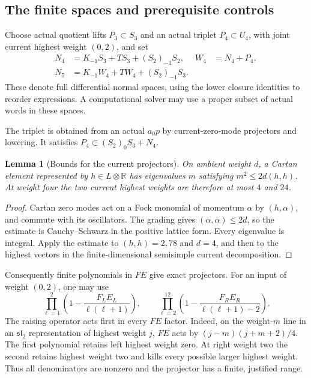 \documentclass[11pt,a4paper]{article}
\newtheorem{lemma}[theorem]{Lemma}
\theoremstyle{definition}
\begin{document}
\subsection{The finite spaces and prerequisite controls}
Choose actual quotient lifts \(P_3\subset S_3\) and an actual triplet
\(P_4\subset U_4\), with joint current highest weight \((0,2)\), and set
\begin{align}
 N_4&=K_{-1}S_3+TS_3+(S_2)_{-1}S_2,&W_4&=N_4+P_4,\label{eq:normal4}\\
 N_5&=K_{-1}W_4+TW_4+(S_2)_{-1}S_3.&&\label{eq:normal5}
\end{align}
These denote full differential normal spaces, using the lower closure
identities to reorder expressions. A computational solver may use a
proper subset of actual words in these spaces.

The triplet is obtained from an actual \(a_0p\) by current-zero-mode
projectors and lowering. It satisfies
\(P_4\subset (S_2)_0S_3+N_4\).

\begin{lemma}[Bounds for the current projectors]\label{lem:current-bounds}
On ambient weight $d$, a Cartan element represented by $h\in L\otimes\mathbb R$
has eigenvalues $m$ satisfying $m^2\leq2d(h,h)$. At weight four
the two current highest weights are therefore at most $4$ and $24$.
\end{lemma}
\begin{proof}
Cartan zero modes act on a Fock monomial of momentum $\alpha$ by
$(h,\alpha)$, and commute with its oscillators. The grading gives
$(\alpha,\alpha)\leq2d$, so the estimate is Cauchy--Schwarz in the
positive lattice form. Every eigenvalue is integral. Apply the estimate
to $(h,h)=2,78$ and $d=4$, and then to the highest vectors in the
finite-dimensional semisimple current decomposition.
\end{proof}

Consequently finite polynomials in \(FE\) give exact projectors.
For an input of weight \((0,2)\), one may use
\[
 \prod_{\ell=1}^{2}\left(1-\frac{F_LE_L}{\ell(\ell+1)}\right),
 \qquad
 \prod_{\ell=2}^{12}\left(1-\frac{F_RE_R}{\ell(\ell+1)-2}\right).
\]
The raising operator acts first in every \(FE\) factor.
Indeed, on the weight-$m$ line in an $\mathfrak{sl}_2$ representation
of highest weight $j$, $FE$ acts by $(j-m)(j+m+2)/4$. The first
polynomial retains left highest weight zero. At right weight two the
second retains highest weight two and kills every possible larger
highest weight. Thus all denominators are nonzero and the projector
has a finite, justified range.
\end{document}
